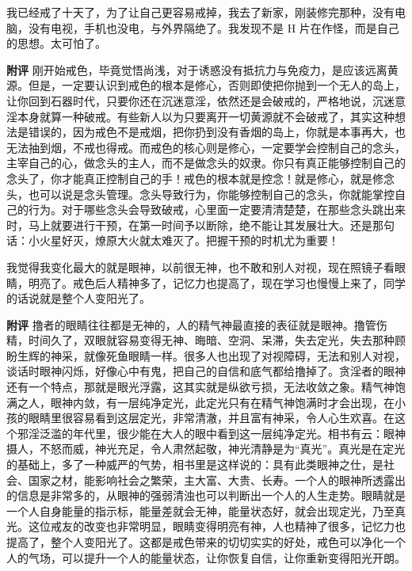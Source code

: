 \begin{case}
    我已经戒了十天了，为了让自己更容易戒掉，我去了新家，刚装修完那种，没有电脑，没有电视，手机也没电，与外界隔绝了。我发现不是 H 片在作怪，而是自己的思想。太可怕了。

    \textbf{附评} 刚开始戒色，毕竟觉悟尚浅，对于诱惑没有抵抗力与免疫力，是应该远离黄源。但是，一定要认识到戒色的根本是修心，否则即使把你抛到一个无人的岛上，让你回到石器时代，只要你还在沉迷意淫，依然还是会破戒的，严格地说，沉迷意淫本身就算一种破戒。有些新人以为只要离开一切黄源就不会破戒了，其实这种想法是错误的，因为戒色不是戒烟，把你扔到没有香烟的岛上，你就是本事再大，也无法抽到烟，不戒也得戒。而戒色的核心则是修心，一定要学会控制自己的念头，主宰自己的心，做念头的主人，而不是做念头的奴隶。你只有真正能够控制自己的念头了，你才能真正控制自己的手！戒色的根本就是控念！就是修心，就是修念头，也可以说是念头管理。念头导致行为，你能够控制自己的念头，你就能掌控自己的行为。对于哪些念头会导致破戒，心里面一定要清清楚楚，在那些念头跳出来时，马上就要进行干预，在第一时间予以断除，绝不能让其发展壮大。还是那句话：小火星好灭，燎原大火就太难灭了。把握干预的时机尤为重要！
\end{case}

\begin{case}
    我觉得我变化最大的就是眼神，以前很无神，也不敢和别人对视，现在照镜子看眼睛，明亮了。戒色后人精神多了，记忆力也提高了，现在学习也慢慢上来了，同学的话说就是整个人变阳光了。

    \textbf{附评} 撸者的眼睛往往都是无神的，人的精气神最直接的表征就是眼神。撸管伤精，时间久了，双眼就容易变得无神、晦暗、空洞、呆滞，失去定光，失去那种顾盼生辉的神采，就像死鱼眼睛一样。很多人也出现了对视障碍，无法和别人对视，谈话时眼神闪烁，好像心中有鬼，把自己的自信和底气都给撸掉了。贪淫者的眼神还有一个特点，那就是眼光浮露，这其实就是纵欲亏损，无法收敛之象。精气神饱满之人，眼神内敛，有一层纯净定光，此定光只有在精气神饱满时才会出现，在小孩的眼睛里很容易看到这层定光，非常清澈，并且富有神采，令人心生欢喜。在这个邪淫泛滥的年代里，很少能在大人的眼中看到这一层纯净定光。相书有云：眼神摄人，不怒而威，神光充足，令人肃然起敬，神光清静是为“真光”。真光是在定光的基础上，多了一种威严的气势，相书里是这样说的：具有此类眼神之仕，是社会、国家之材，能影响社会之繁荣，主大富、大贵、长寿。一个人的眼神所透露出的信息是非常多的，从眼神的强弱清浊也可以判断出一个人的人生走势。眼睛就是一个人自身能量的指示标，能量差就会无神，能量状态好，就会出现定光，乃至真光。这位戒友的改变也非常明显，眼睛变得明亮有神，人也精神了很多，记忆力也提高了，整个人变阳光了。这都是戒色带来的切切实实的好处，戒色可以净化一个人的气场，可以提升一个人的能量状态，让你恢复自信，让你重新变得阳光开朗。
\end{case}

